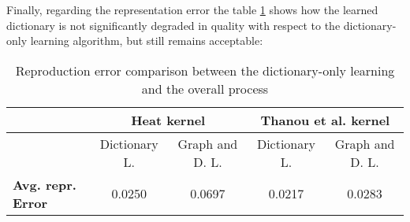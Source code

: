 Finally, regarding the representation error the table \ref{tab:errorGD} shows how the learned dictionary is not significantly degraded in quality with respect to the dictionary-only learning algorithm, but still remains acceptable:

\begin{table}[htbp]
  \centering
  \begin{tabular}{lcccc}
  &\multicolumn{2}{c}{\textbf{Heat kernel}}&\multicolumn{2}{c}{\textbf{Thanou et al. kernel}}\\
  \toprule
  &Dictionary L. & Graph and D. L. & Dictionary L. & Graph and D. L.\\ %
    \midrule
    \textbf{Avg. repr. Error} & 0.0250 & 0.0697 & 0.0217 & 0.0283\\
    \bottomrule
  \end{tabular}
  \caption{Reproduction error comparison between the dictionary-only learning and the overall process}
  \label{tab:errorGD}
\end{table}
